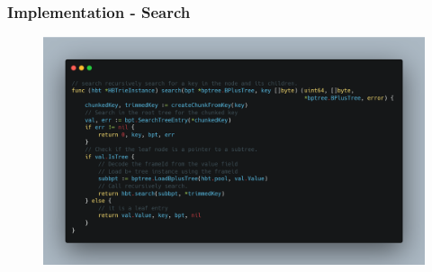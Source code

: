 \documentclass[aspectratio=169]{beamer}
\begin{document}
\begin{frame}[t]
	\frametitle{Implementation - Search}
	\begin{figure}[h!]
		\includegraphics[scale=0.18]{code_search}
	\end{figure}
	\centering
\end{frame}
\end{document}
